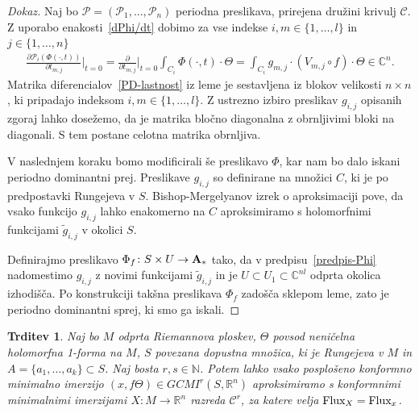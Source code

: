 \documentclass[12pt,a4paper,twoside]{article}
\theoremstyle{definition} %
\newenvironment{dokaz}[1][Dokaz]{\begin{proof}[#1]}{\end{proof}}
\theoremstyle{plain} %
\newtheorem{trditev}[definicija]{Trditev}
\numberwithin{equation}{section}  %
\newcommand{\R}{\mathbb R}
\newcommand{\N}{\mathbb N}
\newcommand{\C}{\mathbb C}
\begin{document}
\begin{dokaz}
Naj bo $\mathcal{P} = (\mathcal{P}_{1}, \dots, \mathcal{P}_{n})$ periodna preslikava, prirejena družini krivulj $\mathcal{C}$. Z uporabo enakosti~\ref{dPhi/dt} dobimo za vse indekse $i, m \in \{1, \dots, l \}$ in $j \in \{1, \dots, n \}$
\begin{align}
\frac{\partial \mathcal{P}_{i}(\Phi(\cdot, t))}{\partial t_{m,j}} \Big|_{t=0} = \frac{\partial}{\partial t_{m,j}} \Big|_{t=0} \int_{C_{i}} \Phi(\cdot, t) \cdot \Theta = \int_{C_{i}} g_{m,j} \cdot (V_{m,j} \circ f) \cdot \Theta \in \C^{n}.
\end{align}
Matrika diferencialov~\ref{PD-lastnost} iz leme je sestavljena iz blokov velikosti $n \times n$, ki pripadajo indeksom $i, m \in \{1, \dots, l \}$. Z ustrezno izbiro preslikav $g_{i,j}$ opisanih zgoraj lahko dosežemo, da je matrika bločno diagonalna z obrnljivimi bloki na diagonali. S tem postane celotna matrika obrnljiva.

V naslednjem koraku bomo modificirali še preslikavo $\Phi$, kar nam bo dalo iskani periodno dominantni prej.
Preslikave $g_{i,j}$ so definirane na množici $C$, ki je po predpostavki Rungejeva v $S$. Bishop-Mergelyanov izrek o aproksimaciji pove, da vsako funkcijo $g_{i,j}$ lahko enakomerno na $C$ aproksimiramo s holomorfnimi funkcijami $\tilde{g}_{i,j}$ v okolici $S$.

Definirajmo preslikavo $\Phi_{f} \colon S \times U \to \textbf{\textup{A}}_{*}$ tako, da v predpisu~\ref{predpis-Phi} nadomestimo $g_{i,j}$ z novimi funkcijami $\tilde{g}_{i,j}$ in je $U \subset U_{1} \subset \C^{nl}$ odprta okolica izhodišča. Po konstrukciji takšna preslikava $\Phi_{f}$ zadošča sklepom leme, zato je periodno dominantni sprej, ki smo ga iskali.
\end{dokaz}

\begin{trditev}
Naj bo $M$ odprta Riemannova ploskev, $\Theta$ povsod neničelna holomorfna 1-forma na $M$, $S$ povezana dopustna množica, ki je Rungejeva v $M$ in $A=\{a_{1}, \dots , a_{k} \} \subset S$. Naj bosta $r, s \in \N$. 
Potem lahko vsako posplošeno konformno minimalno imerzijo $(x, f\Theta) \in GCMI^{r}(S,\R^{n})$ aproksimiramo s konformnimi minimalnimi imerzijami $X \colon M \to \R^{n}$ razreda $\mathcal{C}^{r}$, za katere velja $\textup{Flux}_{X} = \textup{Flux}_{x}$. 
\end{trditev}
\end{document}

